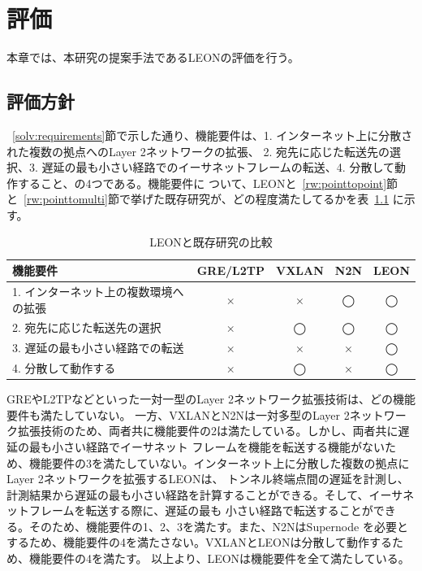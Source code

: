\chapter{評価}
\label{experiment}

本章では、本研究の提案手法であるLEONの評価を行う。

\section{評価方針}
\label{applicationperformance}

~\ref{solv:requirements}節で示した通り、機能要件は、1. インターネット上に分散された複数の拠点へのLayer 2ネットワークの拡張、
2. 宛先に応じた転送先の選択、3. 遅延の最も小さい経路でのイーサネットフレームの転送、4. 分散して動作すること、の4つである。機能要件に
ついて、LEONと~\ref{rw:pointtopoint}節と~\ref{rw:pointtomulti}節で挙げた既存研究が、どの程度満たしてるかを表~\ref{table:relatedworksandleon}
に示す。

\begin{table}[h]
	\begin{center}
		\caption{LEONと既存研究の比較}
		\begin{tabular}{|l|c|c|c|c|}
			\hline
			機能要件 & GRE/L2TP & VXLAN & N2N & LEON \\
			\hline
			\hline
			1. インターネット上の複数環境への拡張 & × & × & ◯ & ◯ \\
			\hline
			2. 宛先に応じた転送先の選択 & × & ◯ & ◯ & ◯ \\
			\hline
			3. 遅延の最も小さい経路での転送 & × & × & × & ◯ \\
			\hline
			4. 分散して動作する & × & ◯ & × & ◯ \\
			\hline
		\end{tabular}
		\label{table:relatedworksandleon}
	\end{center}
\end{table}

GREやL2TPなどといった一対一型のLayer 2ネットワーク拡張技術は、どの機能要件も満たしていない。
一方、VXLANとN2Nは一対多型のLayer 2ネットワーク拡張技術のため、両者共に機能要件の2は満たしている。しかし、両者共に遅延の最も小さい経路でイーサネット
フレームを機能を転送する機能がないため、機能要件の3を満たしていない。インターネット上に分散した複数の拠点にLayer 2ネットワークを拡張するLEONは、
トンネル終端点間の遅延を計測し、計測結果から遅延の最も小さい経路を計算することができる。そして、イーサネットフレームを転送する際に、遅延の最も
小さい経路で転送することができる。そのため、機能要件の1、2、3を満たす。また、N2NはSupernode
を必要とするため、機能要件の4を満たさない。VXLANとLEONは分散して動作するため、機能要件の4を満たす。
以上より、LEONは機能要件を全て満たしている。

